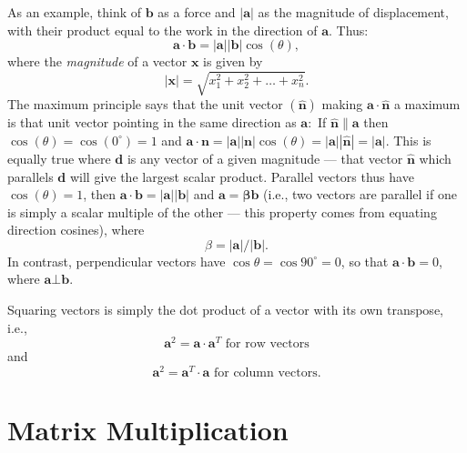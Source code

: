 As an example, think of $\mathbf b$ as a force and $|\mathbf a|$ as the magnitude of displacement, with their product equal to the work in the 
direction of $\mathbf a$. Thus:
\begin{equation}
\mathbf{a \cdot b = |a||b|} \cos (\theta),
\end{equation}	 
where the \emph{magnitude} of a vector $\mathbf x$ is given by
\begin{equation}
|\mathbf{x}| = \sqrt{x^2_1 + x ^2_2 + \ldots + x^2_n}. 
\end{equation}
The maximum principle says that the unit vector $\mathbf{(\hat{n})}$ making $\mathbf{ a \cdot \hat{n}}$ a maximum is that unit vector 
pointing in the same direction as $\mathbf{a}:$ If $\mathbf{\hat{n} \parallel a}$ then $\cos(\theta) = \cos(0^{\circ}) = 1$ and $\mathbf{a\cdot n = |a| |n|}\cos(\theta) =  
\mathbf{|a||\hat{n}| = |a|}$. This is equally true where $\mathbf{d}$ is any vector of a given magnitude --- that vector $\mathbf{\hat{n}}$ which 
parallels $\mathbf{d}$ will give the largest scalar product.
Parallel vectors thus have $\cos(\theta) = 1$, then $\mathbf{a \cdot b = |a||b|}$ and 
$\mathbf{a = \beta b}$ (i.e., two vectors are parallel if 
one is simply a scalar multiple of the other --- this property comes from equating direction cosines), 
where
\begin{equation}
\beta =  \mathbf{|a|/|b|}.
\end{equation}
In contrast, perpendicular vectors have $\cos \theta = \cos 90^\circ = 0$, so that $\mathbf{ a \cdot b} = 0$, where $\mathbf{a \bot   b}$.

Squaring vectors is simply the dot product of a vector with its own transpose, i.e.,
\begin{equation}
\mathbf{a}^2 = \mathbf{ a \cdot a}^T \mbox{ for row vectors}
\end{equation}
and
\begin{equation}
\mathbf{a}^2 = \mathbf{ a}^T \cdot \mathbf{a} \mbox{ for column vectors}.
\end{equation}

\section{Matrix Multiplication}

